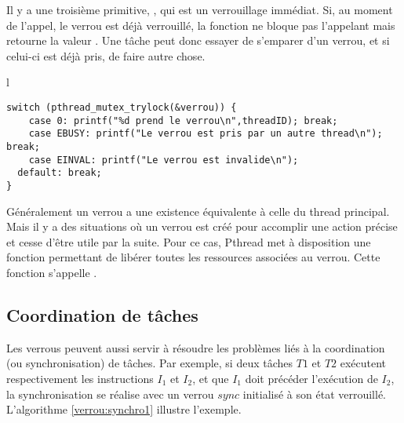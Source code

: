Il y a une troisième primitive, , qui est un verrouillage immédiat. Si, au moment de l'appel, le verrou est déjà verrouillé, la fonction ne bloque pas l'appelant mais retourne la valeur . Une tâche peut donc essayer de s'emparer d'un verrou, et si celui-ci est déjà pris, de faire autre chose.
\centering
\vspace{-0.2 cm}
\begin{tabular}{l}
\begin{lstlisting}
switch (pthread_mutex_trylock(&verrou)) {
	case 0: printf("%d prend le verrou\n",threadID); break;
	case EBUSY: printf("Le verrou est pris par un autre thread\n"); break;
	case EINVAL: printf("Le verrou est invalide\n");
  default: break;
}
\end{lstlisting}
\end{tabular}


Généralement un verrou a une existence équivalente à celle du thread principal. Mais il y a des situations où un verrou est créé pour accomplir une action précise et cesse d'être utile par la suite. Pour ce cas, Pthread met à disposition une fonction permettant de libérer toutes les ressources associées au verrou. Cette fonction s'appelle .

\subsection{Coordination de tâches}
Les verrous peuvent aussi servir à résoudre les problèmes liés à la coordination (ou synchronisation) de tâches.  Par exemple, si deux tâches $T1$ et $T2$ exécutent respectivement les instructions $I_1$ et $I_2$, et que $I_1$ doit précéder l'exécution de $I_2$, la synchronisation se réalise avec un verrou $sync$ initialisé à son état verrouillé.
L'algorithme \ref{verrou:synchro1} illustre l'exemple.

